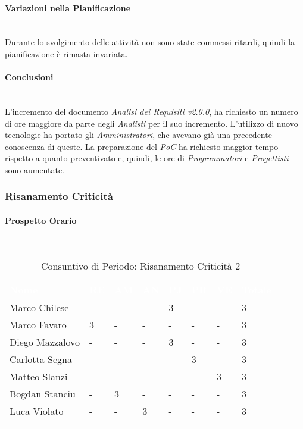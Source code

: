 \paragraph{Variazioni nella Pianificazione} ~\\
Durante lo svolgimento delle attività non sono state commessi ritardi, quindi la pianificazione è rimasta invariata. \\

\paragraph{Conclusioni} ~\\
L'incremento del documento \textit{Analisi dei Requisiti v2.0.0}, ha richiesto un numero di ore maggiore da parte degli \textit{Analisti} per il suo incremento. L'utilizzo di nuovo tecnologie ha portato gli \textit{Amministratori}, che avevano già una precedente conoscenza di queste. La preparazione del \textit{PoC} ha richiesto maggior tempo rispetto a quanto preventivato e, quindi, le ore di \textit{Programmatori} e \textit{Progettisti} sono aumentate. 

\subsubsection{Risanamento Criticità}
\label{RA2}

\paragraph{Prospetto Orario} \-\\

\begin{longtable}{|C{.30\textwidth}|C{.06\textwidth}|C{.06\textwidth}|C{.06\textwidth} | C{.06\textwidth}| C{.06\textwidth} | C{.06\textwidth} | C{.10\textwidth} |}
\hline
{}	\textbf{\textcolor{white}{Nome}} & \textbf{\textcolor{white}{RE}} & \textbf{\textcolor{white}{AM}} & \textbf{\textcolor{white}{AN}} & \textbf{\textcolor{white}{PJ}} & \textbf{\textcolor{white}{PR}} & \textbf{\textcolor{white}{VE}} & \textbf{\textcolor{white}{Totale}}\\
\hline \hline

Marco Chilese & - & - & - & 3 & - & - & 3\\
\hline
{}Marco Favaro & 3 & - & - & - & - & - & 3 \\
\hline
Diego Mazzalovo & - & - & - & 3 & - & - & 3 \\
\hline
{}Carlotta Segna & - & - & - & - & 3 & - & 3\\
\hline
Matteo Slanzi & - & - & - & - & - & 3 & 3\\
\hline
{}Bogdan Stanciu & - & 3 & - & - & - & - & 3 \\
\hline
Luca Violato & - & - & 3 & - & - & - & 3 \\
\hline

\caption{Consuntivo di Periodo: Risanamento Criticità 2}
\label{Distribuzione oraria del periodo di rc2}
\end{longtable}


